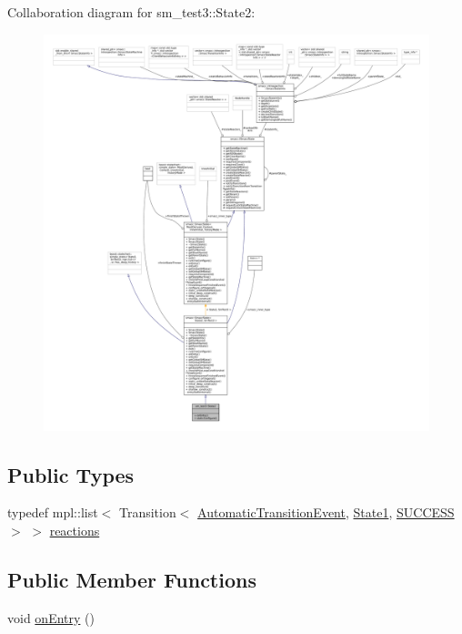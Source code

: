Collaboration diagram for sm\+\_\+test3\+:\+:State2\+:
\nopagebreak
\begin{figure}[H]
\begin{center}
\leavevmode
\includegraphics[width=350pt]{structsm__test3_1_1State2__coll__graph}
\end{center}
\end{figure}
\subsection*{Public Types}
\begin{DoxyCompactItemize}
\item 
typedef mpl\+::list$<$ Transition$<$ \hyperlink{structsm__test3_1_1AutomaticTransitionEvent}{Automatic\+Transition\+Event}, \hyperlink{structsm__test3_1_1State1}{State1}, \hyperlink{classSUCCESS}{S\+U\+C\+C\+E\+SS} $>$ $>$ \hyperlink{structsm__test3_1_1State2_a5ba69a45160e9af742cf6077167a3a15}{reactions}
\end{DoxyCompactItemize}
\subsection*{Public Member Functions}
\begin{DoxyCompactItemize}
\item 
void \hyperlink{structsm__test3_1_1State2_a2636f08d6bbfe258c2a3c8dd966e1028}{on\+Entry} ()
\end{DoxyCompactItemize}
